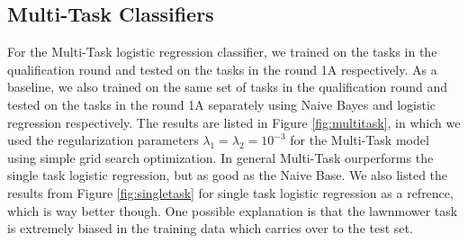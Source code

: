 \subsection{Multi-Task Classifiers}
For the Multi-Task logistic regression classifier, we trained on the tasks in the qualification round and tested on the tasks in the round 1A respectively. As a baseline, we also trained on the same set of tasks in the qualification round and tested on the tasks in the round 1A separately using Naive Bayes and logistic regression respectively. The results are listed in Figure \ref{fig:multitask}, in which we used the regularization parameters $\lambda_1 = \lambda_2 = 10^{-3}$ for the Multi-Task model using simple grid search optimization. In general Multi-Task ourperforms the single task logistic regression, but as good as the Naive Base. We also listed the results from Figure \ref{fig:singletask} for single task logistic regression as a refrence, which is way better though. One possible explanation is that the lawnmower task is extremely biased in the training data which carries over to the test set.  


